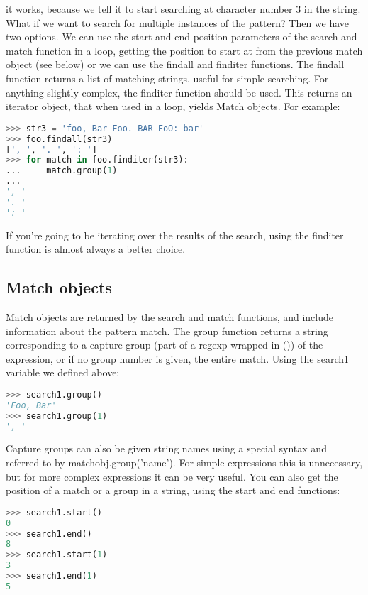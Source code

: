 it works, because we tell it to start searching at character number 3 in the
string.  What if we want to search for multiple instances of the pattern? Then
we have two options. We can use the start and end position parameters of the
search and match function in a loop, getting the position to start at from the
previous match object (see below) or we can use the findall and finditer
functions. The findall function returns a list of matching strings, useful for
simple searching. For anything slightly complex, the finditer function should be
used. This returns an iterator object, that when used in a loop, yields Match
objects. For example:
\lstset{basicstyle=\scriptsize, numbers=left, captionpos=b, tabsize=4}
\begin{lstlisting}[caption=Search return Iterator,language={Python},
xleftmargin=15pt, label=lst:searchreturniterator]
>>> str3 = 'foo, Bar Foo. BAR FoO: bar'
>>> foo.findall(str3)
[', ', '. ', ': ']
>>> for match in foo.finditer(str3):
...     match.group(1)
...
', '
'. '
': '
\end{lstlisting}

If you're going to be iterating over the results of the search, using the
finditer function is almost always a better choice.

\subsection{Match objects}
Match objects are returned by the search and match functions, and include
information about the pattern match.  The group function returns a string
corresponding to a capture group (part of a regexp wrapped in ()) of the
expression, or if no group number is given, the entire match. Using the search1
variable we defined above:
\lstset{basicstyle=\scriptsize, numbers=left, captionpos=b, tabsize=4}
\begin{lstlisting}[caption=Match function,language={Python},
xleftmargin=15pt, label=lst:matchfunction]
>>> search1.group()
'Foo, Bar'
>>> search1.group(1)
', '
\end{lstlisting}
	
Capture groups can also be given string names using a special syntax and
referred to by matchobj.group('name'). For simple expressions this is
unnecessary, but for more complex expressions it can be very useful.  You can
also get the position of a match or a group in a string, using the start and end
functions:
\lstset{basicstyle=\scriptsize, numbers=left, captionpos=b, tabsize=4}
\begin{lstlisting}[caption=Capture groups,language={Python},
xleftmargin=15pt, label=lst:capturegroups]
>>> search1.start()
0
>>> search1.end()
8
>>> search1.start(1)
3
>>> search1.end(1)
5
\end{lstlisting}

